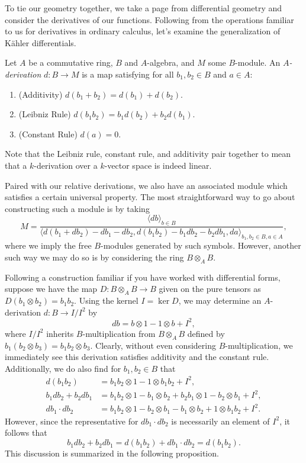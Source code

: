 To tie our geometry together,
we take a page from differential geometry and consider the derivatives of our functions.
Following from the operations familiar to us for derivatives in ordinary calculus,
let's examine the generalization of K\"{a}hler differentials.

\begin{definition}
    Let $A$ be a commutative ring, 
    $B$ and $A$-algebra,
    and $M$ some $B$-module.
    An \textit{$A$-derivation} $d : B \to M$ is  a map satisfying for all $b_1, b_2 \in B$ and $a \in A$:
    \begin{enumerate}
        \item (Additivity) $ d(b_1 + b_2) = d(b_1) + d(b_2)$.
        \item (Leibniz Rule) $d(b_1b_2) = b_1d(b_2) + b_2d(b_1)$.
        \item (Constant Rule) $d(a) = 0$.
    \end{enumerate}
\end{definition}

Note that the Leibniz rule, constant rule, and additivity pair together to mean that a $k$-derivation over a $k$-vector space is indeed linear.

Paired with our relative derivations,
we also have an associated module which satisfies a certain universal property.
The most straightforward way to go about constructing such a module is by taking
\[
    M = \frac{
        \langle
            db 
        \rangle_{b \in B}
    }{
        \langle 
            d(b_1 + db_2) - db_1 - db_2,
            d(b_1b_2) - b_1db_2 - b_2db_1,
            da
        \rangle_{b_1, b_2 \in B, a \in A}
    },
\]
where we imply the free $B$-modules generated by such symbols.
However, another such way we may do so is by considering the ring $B \otimes_A B$.

Following a construction familiar if you have worked with differential forms, 
suppose we have the map $D : B \otimes_A B \to B$ given on the pure tensors as $D(b_1 \otimes b_2) = b_1b_2$.
Using the kernel $I = \ker D$,
we may determine an $A$-derivation $d : B \to I/I^2$ by
\[
    db = b \otimes 1 - 1 \otimes b + I^2,
\]
where $I/I^2$ inherits $B$-multiplication from $B \otimes_A B$ defined by $b_1(b_2 \otimes b_3) = b_1b_2 \otimes b_3$.
Clearly, without even considering $B$-multiplication,
we immediately see this derivation satisfies additivity and the constant rule.
Additionally, we do also find for $b_1, b_2 \in B$ that
\begin{align}
    d(b_1b_2) & = b_1b_2 \otimes 1 - 1 \otimes b_1b_2 + I^2, \\
    b_1db_2 + b_2db_1 
    & = b_1b_2 \otimes 1 - b_1 \otimes b_2
        + b_2b_1 \otimes 1 - b_2 \otimes b_1 + I^2, \\
    db_1 \cdot db_2 
    & = b_1b_2 \otimes 1 - b_2 \otimes b_1
        - b_1 \otimes b_2 + 1 \otimes b_1b_2 + I^2.
\end{align}
However, since the representative for $db_1 \cdot db_2$ is necessarily an element of $I^2$, it follows that
\[
    b_1db_2 + b_2db_1 = d(b_1b_2) + db_1 \cdot db_2 = d(b_1b_2).
\]
This discussion is summarized in the following proposition.

